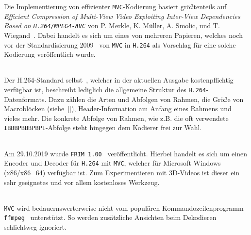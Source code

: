 Die Implementierung von effizienter \texttt{MVC}-Kodierung basiert gr\"o{\ss}tenteils auf
\textit{Efficient Compression of Multi-View Video Exploiting Inter-View Dependencies Based on \texttt{H.264/MPEG4-AVC}}
von P. Merkle, K. M\"uller, A. Smolic, und T. Wiegand~\cite{paper}.
Dabei handelt es sich um eines von mehreren Papieren, welches noch vor der Standardisierung 2009~\cite{mvc} von
\texttt{MVC} in \texttt{H.264} als Vorschlag f\"ur eine solche Kodierung ver\"offentlich wurde.

\noindent\\ Der H.264-Standard selbst~\cite{h264}, welcher in der aktuellen Ausgabe kostenpflichtig verf\"ugbar ist, beschreibt
lediglich die allgemeine Struktur des \texttt{H.264}-Datenformats.
Dazu z\"ahlen die Arten und Abfolgen von Rahmen, die Gr\"o{\ss}e von Macrobl\"ocken
(siehe~[\texttt{}]), Header-Information am Anfang eines Rahmens und vieles mehr.
Die konkrete Abfolge von Rahmen, wie z.B. die oft verwendete \texttt{IBBBPBBBPBPI}-Abfolge\cite{frame-order} steht
hingegen dem Kodierer frei zur Wahl.

\noindent\\ Am 29.10.2019 wurde \texttt{FRIM 1.00}~\cite{frim} ver\"offentlicht.
Hierbei handelt es sich um einen Encoder und Decoder f\"ur \texttt{H.264} mit \texttt{MVC}, welcher f\"ur
Microsoft Windows (x86/x86\_64) verf\"ugbar ist.
Zum Experimentieren mit 3D-Videos ist dieser ein sehr geeignetes und vor allem kostenloses Werkzeug.

\noindent\\ \texttt{MVC} wird bedauernswerterweise nicht vom popul\"aren Kommandozeilenprogramm
\texttt{ffmpeg}~\cite{ffmpeg} unterst\"utzt.
So werden zus\"atzliche Ansichten beim Dekodieren schlichtweg ignoriert.

